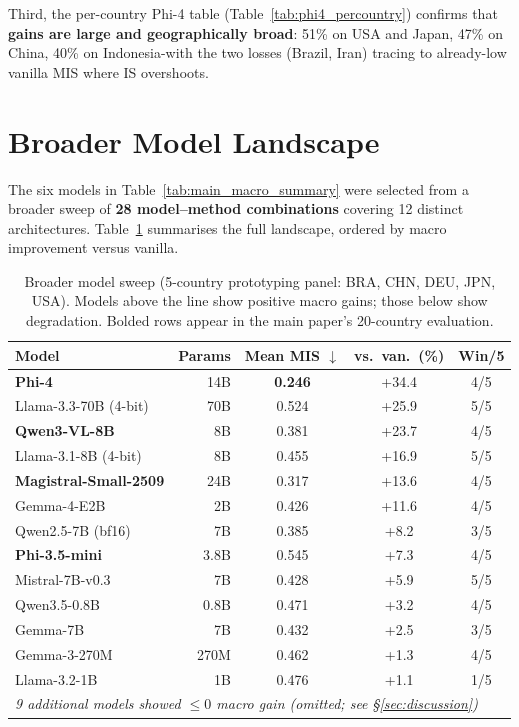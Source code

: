 \documentclass{article}
\newcommand{\gain}[1]{\textcolor{improvegreen}{#1}}
\begin{document}
Third, the per-country Phi-4 table (Table~\ref{tab:phi4_percountry})
confirms that \textbf{gains are large and geographically broad}: 51\% on
USA and Japan, 47\% on China, 40\% on Indonesia-with the two losses
(Brazil, Iran) tracing to already-low vanilla MIS where IS overshoots.

\section{Broader Model Landscape}
\label{app:model_landscape}

The six models in Table~\ref{tab:main_macro_summary} were selected from a broader
sweep of \textbf{28 model--method combinations} covering 12 distinct architectures.
Table~\ref{tab:model_landscape} summarises the full landscape, ordered by macro
improvement versus vanilla.

\begin{table}[h]\centering\scriptsize
\caption{Broader model sweep (5-country prototyping panel: BRA, CHN, DEU, JPN, USA).
Models above the line show positive macro gains; those below show degradation.
Bolded rows appear in the main paper's 20-country evaluation.}
\label{tab:model_landscape}
\setlength{\tabcolsep}{3pt}
\begin{tabular}{lrccc}\toprule
Model & Params & Mean MIS $\downarrow$ & vs.\ van.\ (\%) & Win/5 \\\midrule
\textbf{Phi-4} & 14B & \textbf{0.246} & \gain{+34.4} & 4/5 \\
Llama-3.3-70B (4-bit) & 70B & 0.524 & \gain{+25.9} & 5/5 \\
\textbf{Qwen3-VL-8B} & 8B & 0.381 & \gain{+23.7} & 4/5 \\
Llama-3.1-8B (4-bit) & 8B & 0.455 & \gain{+16.9} & 5/5 \\
\textbf{Magistral-Small-2509} & 24B & 0.317 & \gain{+13.6} & 4/5 \\
Gemma-4-E2B & 2B & 0.426 & \gain{+11.6} & 4/5 \\
Qwen2.5-7B (bf16) & 7B & 0.385 & \gain{+8.2} & 3/5 \\
\textbf{Phi-3.5-mini} & 3.8B & 0.545 & \gain{+7.3} & 4/5 \\
Mistral-7B-v0.3 & 7B & 0.428 & \gain{+5.9} & 5/5 \\
Qwen3.5-0.8B & 0.8B & 0.471 & \gain{+3.2} & 4/5 \\
Gemma-7B & 7B & 0.432 & \gain{+2.5} & 3/5 \\
Gemma-3-270M & 270M & 0.462 & \gain{+1.3} & 4/5 \\
Llama-3.2-1B & 1B & 0.476 & \gain{+1.1} & 1/5 \\
\midrule
\multicolumn{5}{l}{\emph{9 additional models showed $\leq 0$ macro gain (omitted; see \S\ref{sec:discussion})}} \\
\bottomrule
\end{tabular}
\end{table}
\end{document}

